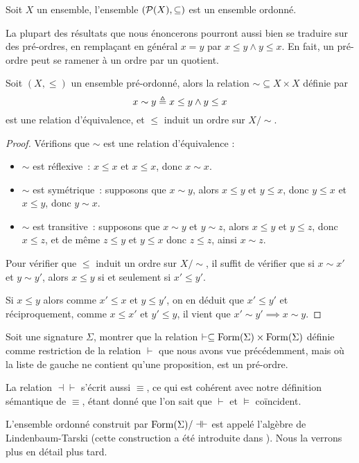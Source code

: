 \begin{example}
  Soit $X$ un ensemble, l'ensemble $(\mathcal{P}(X),\subseteq)$ est un ensemble
  ordonné.
\end{example}

La plupart des résultats que nous énoncerons pourront aussi bien se traduire sur
des pré-ordres, en remplaçant en général $x = y$ par $x\leq y \land y \leq x$.
En fait, un pré-ordre peut se ramener à un ordre par un quotient.

\begin{property}
  Soit $(X,\leq)$ un ensemble pré-ordonné, alors la relation
  $\sim\subseteq X \times X$ définie par
  \[x\sim y \triangleq x\leq y \land y \leq x\]
  est une relation d'équivalence, et $\leq$ induit un ordre sur $X/\sim$.
\end{property}

\begin{proof}
  Vérifions que $\sim$ est une relation d'équivalence :
  \begin{itemize}
  \item $\sim$ est réflexive~: $x\leq x$ et $x\leq x$, donc $x\sim x$.
  \item $\sim$ est symétrique~: supposons que $x\sim y$, alors $x\leq y$ et
    $y\leq x$, donc $y\leq x$ et $x\leq y$, donc $y\sim x$.
  \item $\sim$ est transitive~: supposons que $x\sim y$ et $y\sim z$, alors
    $x\leq y$ et $y\leq z$, donc $x\leq z$, et de même $z\leq y$ et $y\leq x$
    donc $z\leq z$, ainsi $x\sim z$.
  \end{itemize}

  Pour vérifier que $\leq$ induit un ordre sur $X/\sim$, il suffit de vérifier
  que si $x\sim x'$ et $y\sim y'$, alors $x\leq y$ si et seulement si
  $x'\leq y'$.

  Si $x\leq y$ alors comme $x'\leq x$ et $y\leq y'$, on en déduit que
  $x'\leq y'$
  et réciproquement, comme $x\leq x'$ et $y'\leq y$, il vient que
  $x'\sim y'\implies x\sim y$.
\end{proof}

\begin{exercise}
  Soit une signature $\Sigma$, montrer que la relation
  $\vdash\subseteq\operatorname{Form}(\Sigma)\times\operatorname{Form}(\Sigma)$ définie comme
  restriction de la relation $\vdash$ que nous avons vue précédemment, mais où
  la liste de gauche ne contient qu'une proposition, est un pré-ordre.
\end{exercise}

\begin{remark}
  La relation $\dashv\vdash$ s'écrit aussi $\equiv$, ce qui est cohérent avec
  notre définition sémantique de $\equiv$, étant donné que l'on sait que
  $\vdash$ et $\vDash$ coïncident.

  L'ensemble ordonné construit par $\operatorname{Form}(\Sigma)/\dashv\vdash$ est appelé
  l'algèbre de Lindenbaum-Tarski (cette construction a été introduite dans
  \cite{LindenbaumTarski}). Nous la verrons plus en détail plus tard.
\end{remark}

